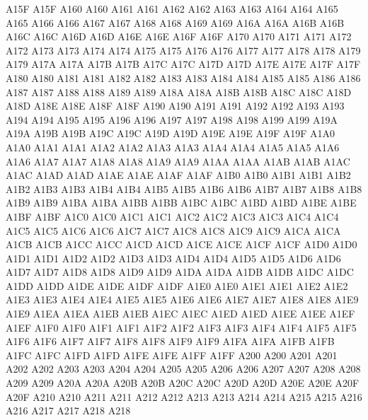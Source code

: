 \ID A15F A15F
\ID A160 A160
\ID A161 A161
\ID A162 A162
\ID A163 A163
\ID A164 A164
\ID A165 A165
\ID A166 A166
\ID A167 A167
\ID A168 A168
\ID A169 A169
\ID A16A A16A
\ID A16B A16B
\ID A16C A16C
\ID A16D A16D
\ID A16E A16E
\ID A16F A16F
\ID A170 A170
\ID A171 A171
\ID A172 A172
\ID A173 A173
\ID A174 A174
\ID A175 A175
\ID A176 A176
\ID A177 A177
\ID A178 A178
\ID A179 A179
\ID A17A A17A
\ID A17B A17B
\ID A17C A17C
\ID A17D A17D
\ID A17E A17E
\ID A17F A17F
\ID A180 A180
\ID A181 A181
\ID A182 A182
\ID A183 A183
\ID A184 A184
\ID A185 A185
\ID A186 A186
\ID A187 A187
\ID A188 A188
\ID A189 A189
\ID A18A A18A
\ID A18B A18B
\ID A18C A18C
\ID A18D A18D
\ID A18E A18E
\ID A18F A18F
\ID A190 A190
\ID A191 A191
\ID A192 A192
\ID A193 A193
\ID A194 A194
\ID A195 A195
\ID A196 A196
\ID A197 A197
\ID A198 A198
\ID A199 A199
\ID A19A A19A
\ID A19B A19B
\ID A19C A19C
\ID A19D A19D
\ID A19E A19E
\ID A19F A19F
\ID A1A0 A1A0
\ID A1A1 A1A1
\ID A1A2 A1A2
\ID A1A3 A1A3
\ID A1A4 A1A4
\ID A1A5 A1A5
\ID A1A6 A1A6
\ID A1A7 A1A7
\ID A1A8 A1A8
\ID A1A9 A1A9
\ID A1AA A1AA
\ID A1AB A1AB
\ID A1AC A1AC
\ID A1AD A1AD
\ID A1AE A1AE
\ID A1AF A1AF
\ID A1B0 A1B0
\ID A1B1 A1B1
\ID A1B2 A1B2
\ID A1B3 A1B3
\ID A1B4 A1B4
\ID A1B5 A1B5
\ID A1B6 A1B6
\ID A1B7 A1B7
\ID A1B8 A1B8
\ID A1B9 A1B9
\ID A1BA A1BA
\ID A1BB A1BB
\ID A1BC A1BC
\ID A1BD A1BD
\ID A1BE A1BE
\ID A1BF A1BF
\ID A1C0 A1C0
\ID A1C1 A1C1
\ID A1C2 A1C2
\ID A1C3 A1C3
\ID A1C4 A1C4
\ID A1C5 A1C5
\ID A1C6 A1C6
\ID A1C7 A1C7
\ID A1C8 A1C8
\ID A1C9 A1C9
\ID A1CA A1CA
\ID A1CB A1CB
\ID A1CC A1CC
\ID A1CD A1CD
\ID A1CE A1CE
\ID A1CF A1CF
\ID A1D0 A1D0
\ID A1D1 A1D1
\ID A1D2 A1D2
\ID A1D3 A1D3
\ID A1D4 A1D4
\ID A1D5 A1D5
\ID A1D6 A1D6
\ID A1D7 A1D7
\ID A1D8 A1D8
\ID A1D9 A1D9
\ID A1DA A1DA
\ID A1DB A1DB
\ID A1DC A1DC
\ID A1DD A1DD
\ID A1DE A1DE
\ID A1DF A1DF
\ID A1E0 A1E0
\ID A1E1 A1E1
\ID A1E2 A1E2
\ID A1E3 A1E3
\ID A1E4 A1E4
\ID A1E5 A1E5
\ID A1E6 A1E6
\ID A1E7 A1E7
\ID A1E8 A1E8
\ID A1E9 A1E9
\ID A1EA A1EA
\ID A1EB A1EB
\ID A1EC A1EC
\ID A1ED A1ED
\ID A1EE A1EE
\ID A1EF A1EF
\ID A1F0 A1F0
\ID A1F1 A1F1
\ID A1F2 A1F2
\ID A1F3 A1F3
\ID A1F4 A1F4
\ID A1F5 A1F5
\ID A1F6 A1F6
\ID A1F7 A1F7
\ID A1F8 A1F8
\ID A1F9 A1F9
\ID A1FA A1FA
\ID A1FB A1FB
\ID A1FC A1FC
\ID A1FD A1FD
\ID A1FE A1FE
\ID A1FF A1FF
\ID A200 A200
\ID A201 A201
\ID A202 A202
\ID A203 A203
\ID A204 A204
\ID A205 A205
\ID A206 A206
\ID A207 A207
\ID A208 A208
\ID A209 A209
\ID A20A A20A
\ID A20B A20B
\ID A20C A20C
\ID A20D A20D
\ID A20E A20E
\ID A20F A20F
\ID A210 A210
\ID A211 A211
\ID A212 A212
\ID A213 A213
\ID A214 A214
\ID A215 A215
\ID A216 A216
\ID A217 A217
\ID A218 A218
